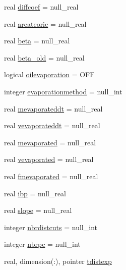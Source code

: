 \begin{DoxyCompactItemize}
\item 
real \mbox{\hyperlink{structmoduleoil_1_1t__var_aa0fe093c582236b2caa13b19dee409e7}{diffcoef}} = null\+\_\+real
\item 
real \mbox{\hyperlink{structmoduleoil_1_1t__var_a7f203adb8a4060da9d4273c1dfeb97b1}{areateoric}} = null\+\_\+real
\item 
real \mbox{\hyperlink{structmoduleoil_1_1t__var_ade7ef8229a6b67f96ebc89e2b7eb59cc}{beta}} = null\+\_\+real
\item 
real \mbox{\hyperlink{structmoduleoil_1_1t__var_ac19e627e5fb6bfc0f1f27f0c0a1aff21}{beta\+\_\+old}} = null\+\_\+real
\item 
logical \mbox{\hyperlink{structmoduleoil_1_1t__var_a9114ea538099933146e2318ef0befe8d}{oilevaporation}} = O\+FF
\item 
integer \mbox{\hyperlink{structmoduleoil_1_1t__var_a3cd844b27e6050b3d3291a8a23c00075}{evaporationmethod}} = null\+\_\+int
\item 
real \mbox{\hyperlink{structmoduleoil_1_1t__var_aae83b39e285ec6ad451789e0057a6e58}{mevaporateddt}} = null\+\_\+real
\item 
real \mbox{\hyperlink{structmoduleoil_1_1t__var_a05d0471abe406404fe1dd9a8b86b3f76}{vevaporateddt}} = null\+\_\+real
\item 
real \mbox{\hyperlink{structmoduleoil_1_1t__var_a6b59f060ed5d9279c81530ed586f2c81}{mevaporated}} = null\+\_\+real
\item 
real \mbox{\hyperlink{structmoduleoil_1_1t__var_abb63b8873e8dea53d2161ec1754dfe51}{vevaporated}} = null\+\_\+real
\item 
real \mbox{\hyperlink{structmoduleoil_1_1t__var_a300e508eb6064c40497063afea2379b3}{fmevaporated}} = null\+\_\+real
\item 
real \mbox{\hyperlink{structmoduleoil_1_1t__var_afb847ff35f0dcbc37b7c8ce5a25c7772}{ibp}} = null\+\_\+real
\item 
real \mbox{\hyperlink{structmoduleoil_1_1t__var_aae26fae6d2183a30457c70916ac25595}{slope}} = null\+\_\+real
\item 
integer \mbox{\hyperlink{structmoduleoil_1_1t__var_a004998a8b41e03beb8f082ea2ba99ba5}{nbrdistcuts}} = null\+\_\+int
\item 
integer \mbox{\hyperlink{structmoduleoil_1_1t__var_a843c0a2e9ce439ee71f030b0710134f5}{nbrpc}} = null\+\_\+int
\item 
real, dimension(\+:), pointer \mbox{\hyperlink{structmoduleoil_1_1t__var_a4c121cb399fa456d98ffd135e3e48557}{tdistexp}}
\item 

\end{DoxyCompactItemize}

